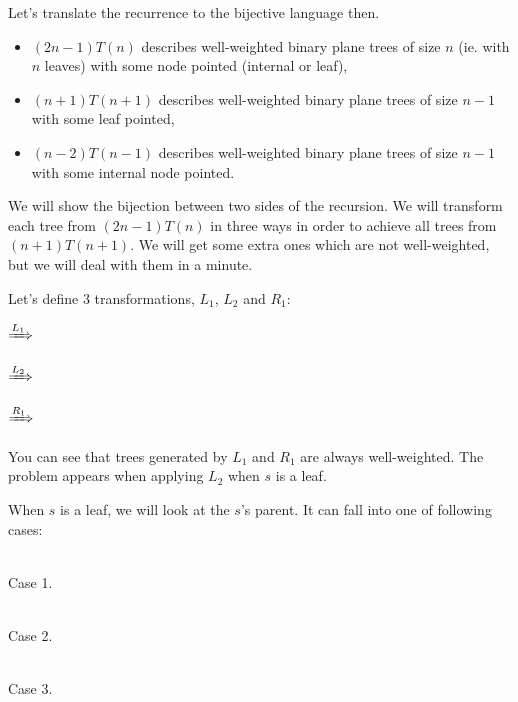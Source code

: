 \documentclass[final]{article}
\theoremstyle{definition}
\theoremstyle{remark}
\newcommand{\includeinlinesvg}[2]{\begin{minipage}{#1\textwidth}\end{minipage}}
\begin{document}
Let's translate the recurrence to the bijective language then.
\begin{itemize}
    \item \((2 n - 1) T(n)\) describes well-weighted binary plane trees of size \(n\) (ie. with \(n\) leaves) with some node pointed (internal or leaf),
    \item \((n + 1) T(n + 1)\) describes well-weighted binary plane trees of size \(n - 1\) with some leaf pointed,
    \item \((n - 2) T(n - 1)\) describes well-weighted binary plane trees of size \(n - 1\) with some internal node pointed.
\end{itemize}

We will show the bijection between two sides of the recursion. We will transform each tree from \((2 n - 1) T(n)\) in three ways in order to achieve all trees from \((n + 1) T(n + 1)\). We will get some extra ones which are not well-weighted, but we will deal with them in a minute.

Let's define 3 transformations, \(L_1\), \(L_2\) and \(R_1\):

\begin{center}
    \includeinlinesvg{.16}{schroder__lr_base}%
    \(\xRightarrow{L_1}\)%
    \includeinlinesvg{.16}{schroder__l1}%
    \hspace{.1\textwidth}%
    \includeinlinesvg{.16}{schroder__lr_base}%
    \(\xRightarrow{L_2}\)%
    \includeinlinesvg{.16}{schroder__l2}%

    \includeinlinesvg{.16}{schroder__lr_base}%
    \(\xRightarrow{R_1}\)%
    \includeinlinesvg{.16}{schroder__r1}%
\end{center}

You can see that trees generated by \(L_1\) and \(R_1\) are always well-weighted. The problem appears when applying \(L_2\) when \(s\) is a leaf.

When \(s\) is a leaf, we will look at the \(s\)'s parent. It can fall into one of following cases:

\begin{center}
    \begin{minipage}[t]{.3\textwidth}
        \begin{center}
            \\
            Case 1.
        \end{center}
    \end{minipage}%
    \begin{minipage}[t]{.3\textwidth}
        \begin{center}
            \\
            Case 2.
        \end{center}
    \end{minipage}%
    \begin{minipage}[t]{.3\textwidth}
        \begin{center}
            \\
            Case 3.
        \end{center}
    \end{minipage}%
\end{center}
\end{document}
